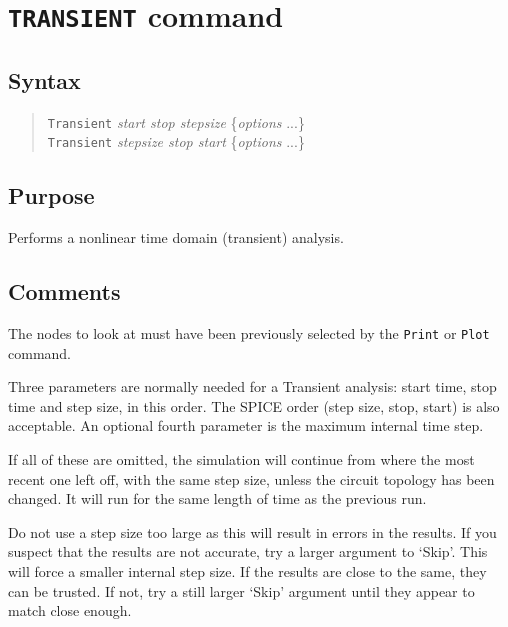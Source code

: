 \section{{\tt TRANSIENT} command}
\subsection{Syntax}
\begin{verse}
{\tt Transient} {\it start stop stepsize} \{{\it options} ...\}\\
{\tt Transient} {\it stepsize stop start} \{{\it options} ...\}
\end{verse}
\subsection{Purpose}

Performs a nonlinear time domain (transient) analysis.
\subsection{Comments}

The nodes to look at must have been previously selected by the {\tt Print} or
{\tt Plot} command.

Three parameters are normally needed for a Transient analysis: start time,
stop time and step size, in this order.  The SPICE order (step size, stop,
start) is also acceptable.  An optional fourth parameter is the maximum internal time step.

If all of these are omitted, the simulation will continue from where the most
recent one left off, with the same step size, unless the circuit topology has
been changed.  It will run for the same length of time as the previous run.

Do not use a step size too large as this will result in errors in the
results.  If you suspect that the results are not accurate, try a larger
argument to `Skip'.  This will force a smaller internal step size.  If the
results are close to the same, they can be trusted.  If not, try a still
larger `Skip' argument until they appear to match close enough.

